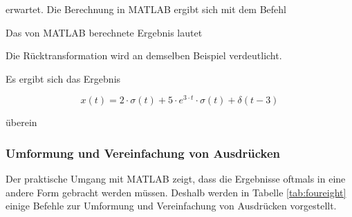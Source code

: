 \noindent erwartet. Die Berechnung in MATLAB ergibt sich mit dem Befehl



\noindent Das von MATLAB berechnete Ergebnis lautet



\noindent Die Rücktransformation wird an demselben Beispiel verdeutlicht.



\noindent Es ergibt sich das Ergebnis



\begin{equation}\label{eq:fourhundredsfiftyeight}
x(t)=2\cdot \sigma (t)+5\cdot e^{3\cdot t} \cdot \sigma (t)+\delta (t-3)
\end{equation}

\noindent überein

\clearpage

\subsubsection{Umformung und Vereinfachung von Ausdrücken}

\noindent Der praktische Umgang mit MATLAB zeigt, dass die Ergebnisse oftmals in eine andere Form gebracht werden müssen. Deshalb werden in Tabelle \ref{tab:foureight} einige Befehle zur Umformung und Vereinfachung von Ausdrücken vorgestellt.

